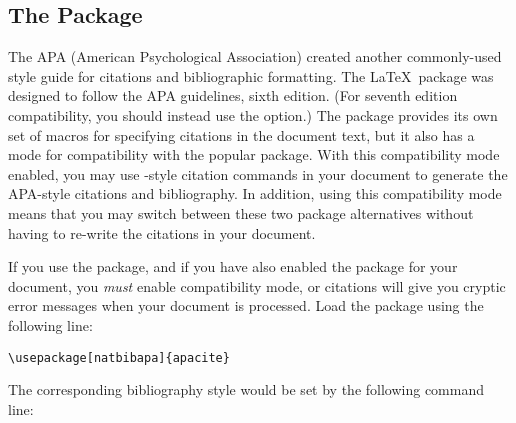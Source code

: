 \subsection{The  Package}
The APA (American Psychological Association) created another
commonly-used style guide for citations and bibliographic formatting.
The \LaTeX\ package  was designed to follow the APA
guidelines, sixth edition. (For seventh edition compatibility, you
should instead use the \BibLaTeX{}  option.)  The
package provides its own set of macros for specifying citations in the
document text, but it also has a mode for compatibility with the
popular  package.  With this compatibility mode enabled,
you may use -style citation commands in your document to
generate the APA-style citations and bibliography.  In addition, using
this compatibility mode means that you may switch between these two
package alternatives without having to re-write the citations in your
document.

If you use the  package, and if you have also enabled
the  package for your document, you \emph{must} enable
 compatibility mode, or citations will give you
cryptic error messages when your document is processed.  Load the
package using the following line:
\begin{verbatim}
\usepackage[natbibapa]{apacite}
\end{verbatim}
The corresponding bibliography style would be set by the following 
command line:
\begin{verbatim}

\end{verbatim}


